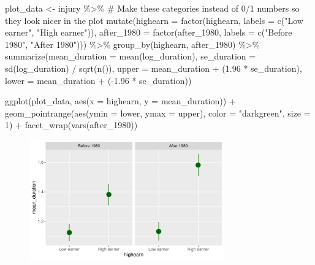 \documentclass[
  letterpaper,
  DIV=11,
  numbers=noendperiod]{scrartcl}
\newenvironment{Shaded}{\begin{snugshade}}{\end{snugshade}}
\newcommand{\AttributeTok}[1]{\textcolor[rgb]{0.40,0.45,0.13}{#1}}
\newcommand{\CommentTok}[1]{\textcolor[rgb]{0.37,0.37,0.37}{#1}}
\newcommand{\DecValTok}[1]{\textcolor[rgb]{0.68,0.00,0.00}{#1}}
\newcommand{\FloatTok}[1]{\textcolor[rgb]{0.68,0.00,0.00}{#1}}
\newcommand{\FunctionTok}[1]{\textcolor[rgb]{0.28,0.35,0.67}{#1}}
\newcommand{\NormalTok}[1]{\textcolor[rgb]{0.00,0.23,0.31}{#1}}
\newcommand{\OtherTok}[1]{\textcolor[rgb]{0.00,0.23,0.31}{#1}}
\newcommand{\SpecialCharTok}[1]{\textcolor[rgb]{0.37,0.37,0.37}{#1}}
\newcommand{\StringTok}[1]{\textcolor[rgb]{0.13,0.47,0.30}{#1}}
\begin{document}
\begin{Shaded}
\begin{Highlighting}[]
\NormalTok{plot\_data }\OtherTok{\textless{}{-}}\NormalTok{ injury }\SpecialCharTok{\%\textgreater{}\%}
  \CommentTok{\# Make these categories instead of 0/1 numbers so they look nicer in the plot}
  \FunctionTok{mutate}\NormalTok{(}\AttributeTok{highearn =} \FunctionTok{factor}\NormalTok{(highearn, }\AttributeTok{labels =} \FunctionTok{c}\NormalTok{(}\StringTok{"Low earner"}\NormalTok{, }\StringTok{"High earner"}\NormalTok{)),}
         \AttributeTok{after\_1980 =} \FunctionTok{factor}\NormalTok{(after\_1980, }\AttributeTok{labels =} \FunctionTok{c}\NormalTok{(}\StringTok{"Before 1980"}\NormalTok{, }\StringTok{"After 1980"}\NormalTok{))) }\SpecialCharTok{\%\textgreater{}\%}
  \FunctionTok{group\_by}\NormalTok{(highearn, after\_1980) }\SpecialCharTok{\%\textgreater{}\%}
  \FunctionTok{summarize}\NormalTok{(}\AttributeTok{mean\_duration =} \FunctionTok{mean}\NormalTok{(log\_duration),}
            \AttributeTok{se\_duration =} \FunctionTok{sd}\NormalTok{(log\_duration) }\SpecialCharTok{/} \FunctionTok{sqrt}\NormalTok{(}\FunctionTok{n}\NormalTok{()),}
            \AttributeTok{upper =}\NormalTok{ mean\_duration }\SpecialCharTok{+}\NormalTok{ (}\FloatTok{1.96} \SpecialCharTok{*}\NormalTok{ se\_duration),}
            \AttributeTok{lower =}\NormalTok{ mean\_duration }\SpecialCharTok{+}\NormalTok{ (}\SpecialCharTok{{-}}\FloatTok{1.96} \SpecialCharTok{*}\NormalTok{ se\_duration))}

\FunctionTok{ggplot}\NormalTok{(plot\_data, }\FunctionTok{aes}\NormalTok{(}\AttributeTok{x =}\NormalTok{ highearn, }\AttributeTok{y =}\NormalTok{ mean\_duration)) }\SpecialCharTok{+}
  \FunctionTok{geom\_pointrange}\NormalTok{(}\FunctionTok{aes}\NormalTok{(}\AttributeTok{ymin =}\NormalTok{ lower, }\AttributeTok{ymax =}\NormalTok{ upper),}
                  \AttributeTok{color =} \StringTok{"darkgreen"}\NormalTok{, }\AttributeTok{size =} \DecValTok{1}\NormalTok{) }\SpecialCharTok{+}
  \FunctionTok{facet\_wrap}\NormalTok{(}\FunctionTok{vars}\NormalTok{(after\_1980))}
\end{Highlighting}
\end{Shaded}

\begin{figure}[H]

{\centering \includegraphics[width=0.75\textwidth,height=\textheight]{DD_wooldridge_injury_files/figure-pdf/plot-pointrange-manual-1.pdf}

}

\end{figure}
\end{document}
